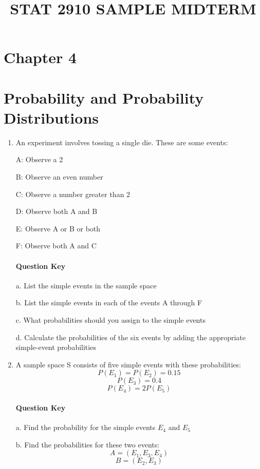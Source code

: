 \documentclass{article}
\title{STAT 2910 SAMPLE MIDTERM}
\begin{document}
\maketitle

\section*{Chapter 4}
\section*{Probability and Probability Distributions}

\begin{enumerate}
    \item An experiment involves tossing a single die. These are some events:
    
    A: Observe a 2

    B: Observe an even number

    C: Observe a number greater than 2

    D: Observe both A and B

    E: Observe A or B or both

    F: Observe both A and C
    
\paragraph*{Question Key} 

    
    
    \hfill \break a. List the simple events in the sample space

    b. List the simple events in each of the events A through F

    c. What probabilities should you assign to the simple events

    d. Calculate the probabilities of the six events by adding the appropriate simple-event probabilities
    
    \item A sample space S consists of five simple events with these probabilities:
    $$P(E_1) = P(E_2) = 0.15$$
    $$P(E_3) = 0.4$$
    $$P(E_4) = 2P(E_5)$$
    \paragraph*{Question Key}
    
    \hfill \break a. Find the probability for the simple events $E_4$ and $E_5$
    
    b. Find the probabilities for these two events:
        $$A = (E_1, E_3, E_4)$$
        $$B = (E_2, E_3)$$
   

\end{enumerate}
\end{document}
